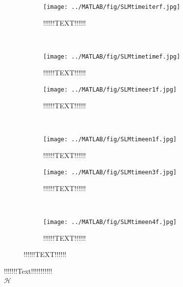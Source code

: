 \begin{figure}[H]
        \centering
        \begin{subfigure}[b]{0.3\textwidth}
                \texttt{[image: ../MATLAB/fig/SLMtimeiterf.jpg]}
                \caption{ !!!!!!TEXT!!!!!! }
                \label{fig:SLMtimeer1}
        \end{subfigure}
        ~
        \begin{subfigure}[b]{0.3\textwidth}
                \texttt{[image: ../MATLAB/fig/SLMtimetimef.jpg]}
                \caption{ !!!!!!TEXT!!!!!! }
                \label{fig:SLMtimeen1}
        \end{subfigure}        
        
        \begin{subfigure}[b]{0.3\textwidth}
                \texttt{[image: ../MATLAB/fig/SLMtimeer1f.jpg]}
                \caption{ !!!!!!TEXT!!!!!! }
                \label{fig:SLMtimeer1}
        \end{subfigure}
        ~
        \begin{subfigure}[b]{0.3\textwidth}
                \texttt{[image: ../MATLAB/fig/SLMtimeen1f.jpg]}
                \caption{ !!!!!!TEXT!!!!!! }
                \label{fig:SLMtimeen1}
        \end{subfigure}
        
        \begin{subfigure}[b]{0.3\textwidth}
                \texttt{[image: ../MATLAB/fig/SLMtimeen3f.jpg]}
                \caption{ !!!!!!TEXT!!!!!! }
                \label{fig:SLMtimeen3}
        \end{subfigure}
        ~
        \begin{subfigure}[b]{0.3\textwidth}
                \texttt{[image: ../MATLAB/fig/SLMtimeen4f.jpg]}
                \caption{ !!!!!!TEXT!!!!!! }
                \label{fig:SLMtimeen4}
        \end{subfigure}


        \caption{ !!!!!!TEXT!!!!!!}
        \label{fig:SLMtime}
\end{figure}

!!!!!!!Text!!!!!!!!!!!\\
$\mathcal{H}$

